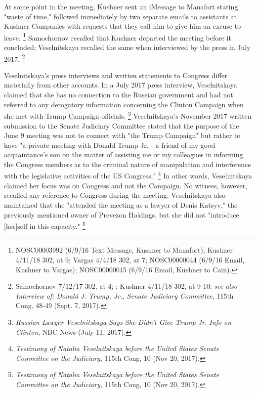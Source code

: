 At some point in the meeting, Kushner sent an iMessage to Manafort stating "waste of time," followed immediately by two separate emails to assistants at Kushner Companies with requests that they call him to give him an excuse to leave.%
\footnote{NOSC00003992 (6/9/16 Text Message, Kushner to Manafort);
Kushner 4/11/18 302, at 9;
Vargas 4/4/18 302, at 7;
NOSC00000044 (6/9/16 Email, Kushner to Vargas);
NOSC00000045 (6/9/16 Email, Kushner to Cain).}
Samochornov recalled that Kushner departed the meeting before it concluded; Veselnitskaya recalled the same when interviewed by the press in July 2017.%
\footnote{Samochornov 7/12/17 302, at 4;
;
Kushner 4/11/18 302, at 9-10;
\textit{see also Interview of: Donald J. Trump, Jr., Senate Judiciary Committee}, 115th Cong. 48-49 (Sept. 7, 2017).}

Veselnitskaya's press interviews and written statements to Congress differ materially from other accounts.
In a July 2017 press interview, Veselnitskaya claimed that she has no connection to the Russian government and had not referred to any derogatory information concerning the Clinton Campaign when she met with Trump Campaign officials.%
\footnote{\textit{Russian Lawyer Veselnitskaya Says She Didn’t Give Trump Jr. Info on Clinton}, NBC News (July 11, 2017).}
Veselnitskaya's November 2017 written submission to the Senate Judiciary Committee stated that the purpose of the June 9 meeting was not to connect with "the Trump Campaign" but rather to have "a private meeting with Donald Trump Jr. - a friend of my good acquaintance's son on the matter of assisting me or my colleagues in informing the Congress members as to the criminal nature of manipulation and interference with the legislative activities of the US Congress."%
\footnote{\textit{Testimony of Natalia Veselnitskaya before the United States Senate Committee on the Judiciary}, 115th Cong, 10 (Nov 20, 2017).}
In other words, Veselnitskaya claimed her focus was on Congress and not the Campaign.
No witness, however, recalled any reference to Congress during the meeting.
Veselnitskaya also maintained that she "attended the meeting as a lawyer of Denis Katsyv," the previously mentioned owner of Prevezon Holdings, but she did not "introduce [her]self in this capacity."%
\footnote{\textit{Testimony of Natalia Veselnitskaya before the United States Senate Committee on the Judiciary}, 115th Cong, 10 (Nov 20, 2017).}

